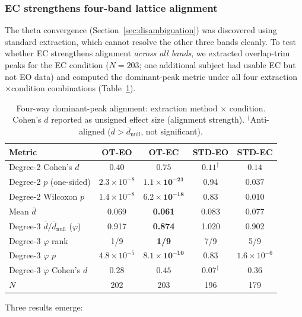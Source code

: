 \documentclass[11pt,a4paper]{article}
\newcommand{\phisym}{\varphi}
\begin{document}
\subsubsection{EC strengthens four-band lattice alignment}
\label{sec:ec_fourband}

The theta convergence (Section~\ref{sec:disambiguation}) was discovered using standard extraction, which cannot resolve the other three bands cleanly. To test whether EC strengthens alignment \textit{across all bands}, we extracted overlap-trim peaks for the EC condition ($N = 203$; one additional subject had usable EC but not EO data) and computed the dominant-peak metric under all four extraction$\times$condition combinations (Table~\ref{tab:fourway}).

\begin{table}[H]
\centering
\caption{Four-way dominant-peak alignment: extraction method $\times$ condition. Cohen's $d$ reported as unsigned effect size (alignment strength). $^{\dagger}$Anti-aligned ($\bar{d} > \bar{d}_{\text{null}}$, not significant).}
\label{tab:fourway}
\begin{tabular}{lcccc}
\toprule
Metric & OT-EO & OT-EC & STD-EO & STD-EC \\
\midrule
Degree-2 Cohen's $d$ & $0.40$ & $\mathbf{0.75}$ & $0.11^{\dagger}$ & $0.14$ \\
Degree-2 $p$ (one-sided) & $2.3 \times 10^{-8}$ & $\mathbf{1.1 \times 10^{-21}}$ & 0.94 & 0.037 \\
Degree-2 Wilcoxon $p$ & $1.4 \times 10^{-8}$ & $\mathbf{6.2 \times 10^{-18}}$ & 0.83 & 0.010 \\
Mean $\bar{d}$ & 0.069 & \textbf{0.061} & 0.083 & 0.077 \\
\midrule
Degree-3 $\bar{d}/\bar{d}_{\text{null}}$ ($\phisym$) & 0.917 & \textbf{0.874} & 1.020 & 0.902 \\
Degree-3 $\phisym$ rank & 1/9 & \textbf{1/9} & 7/9 & 5/9 \\
Degree-3 $\phisym$ $p$ & $4.8 \times 10^{-5}$ & $\mathbf{8.1 \times 10^{-10}}$ & 0.83 & $1.6 \times 10^{-6}$ \\
Degree-3 $\phisym$ Cohen's $d$ & $0.28$ & $\mathbf{0.45}$ & $0.07^{\dagger}$ & $0.36$ \\
$N$ & 202 & 203 & 196 & 179 \\
\bottomrule
\end{tabular}
\end{table}

\noindent Three results emerge:
\end{document}
